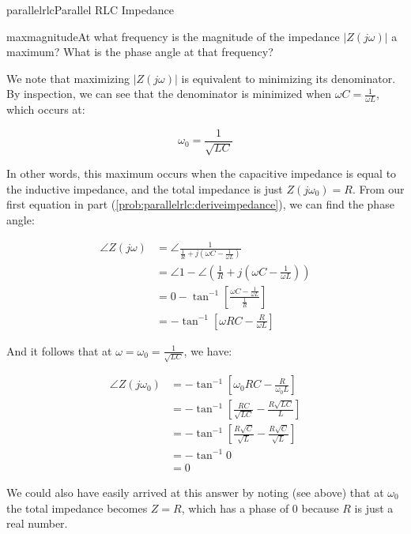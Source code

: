 \begin{mainquestion}{parallelrlc}{Parallel RLC Impedance}
\begin{partquestion}{maxmagnitude}{At what frequency is the magnitude of the impedance $\left|Z\left(j\omega\right)\right|$ a maximum? What is the phase angle at that frequency?}
\begin{answer}
We note that maximizing $\left| Z(j\omega) \right|$ is equivalent to minimizing its denominator. By inspection, we can see that the denominator is minimized when $\omega C = \frac{1}{\omega L}$, which occurs at:

\[
\omega_{0} = \frac{1}{\sqrt{LC}}
\]

In other words, this maximum occurs when the capacitive impedance is equal to the inductive impedance, and the total impedance is just $Z\left(j\omega_{0}\right) = R$. From our first equation in part (\cref{prob:parallelrlc:deriveimpedance}), we can find the phase angle:

\begin{align*}
\angle Z\left(j\omega\right) &= \angle \frac{1}{\frac{1}{R}+j\left(\omega C-\frac{1}{\omega L}\right)}\\
&=\angle 1-\angle\left(\frac{1}{R}+j\left(\omega C-\frac{1}{\omega L}\right)\right)\\
&=0-\tan^{-1}\left[\frac{\omega C-\frac{1}{\omega L}}{\frac{1}{R}}\right]\\
&=-\tan^{-1}\left[\omega RC-\frac{R}{\omega L}\right]
\end{align*}

And it follows that at $\omega = \omega_{0} = \frac{1}{\sqrt{LC}}$, we have:

\begin{align*}
\angle Z\left(j\omega_0\right) &= -\tan^{-1}\left[\omega_0 RC-\frac{R}{\omega_0 L}\right]\\
&= -\tan^{-1}\left[\frac{RC}{\sqrt{LC}}-\frac{R\sqrt{LC}}{L}\right]\\
&= -\tan^{-1}\left[\frac{R\sqrt{C}}{\sqrt{L}}-\frac{R\sqrt{C}}{\sqrt{L}}\right]\\
&= -\tan^{-1}0\\
&= 0
\end{align*}

We could also have easily arrived at this answer by noting (see above) that at $\omega_{0}$ the total impedance becomes $Z = R$, which has a phase of 0 because $R$ is just a real number.
\end{answer}
\end{partquestion}


\end{mainquestion}
